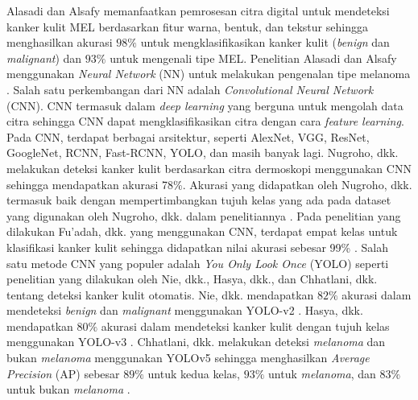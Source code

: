     Alasadi dan Alsafy memanfaatkan pemrosesan citra digital untuk mendeteksi kanker kulit MEL berdasarkan fitur warna, bentuk, dan tekstur sehingga menghasilkan akurasi $98\%$ untuk mengklasifikasikan kanker kulit (\textit{benign} dan \textit{malignant}) dan $93\%$ untuk mengenali tipe MEL. Penelitian Alasadi dan Alsafy menggunakan \textit{Neural Network} (NN) untuk melakukan pengenalan tipe melanoma \citep{Alasadi2015a}. Salah satu perkembangan dari NN adalah \textit{Convolutional Neural Network} (CNN). CNN termasuk dalam \textit{deep learning} yang berguna untuk mengolah data citra sehingga CNN dapat mengklasifikasikan citra dengan cara \textit{feature learning}. Pada CNN, terdapat berbagai arsitektur, seperti AlexNet, VGG, ResNet, GoogleNet, RCNN, Fast-RCNN, YOLO, dan masih banyak lagi. Nugroho, dkk. melakukan deteksi kanker kulit berdasarkan citra dermoskopi menggunakan CNN sehingga mendapatkan akurasi 78\%. Akurasi yang didapatkan oleh Nugroho, dkk. termasuk baik dengan mempertimbangkan tujuh kelas yang ada pada dataset yang digunakan oleh Nugroho, dkk. dalam penelitiannya \citep{Nugroho2019}. Pada penelitian yang dilakukan Fu’adah, dkk. yang menggunakan CNN, terdapat empat kelas untuk klasifikasi kanker kulit sehingga didapatkan nilai akurasi sebesar 99\% \citep{Fuadah2020a}. Salah satu metode CNN yang populer adalah \textit{You Only Look Once} (YOLO) seperti penelitian yang dilakukan oleh Nie, dkk., Hasya, dkk., dan Chhatlani, dkk. tentang deteksi kanker kulit otomatis. Nie, dkk. mendapatkan $82\%$ akurasi dalam mendeteksi \textit{benign} dan \textit{malignant} menggunakan YOLO-v2 \citep{Nie2019a}. Hasya, dkk. mendapatkan $80\%$ akurasi dalam mendeteksi kanker kulit dengan tujuh kelas menggunakan YOLO-v3 \citep{Hasya2021}. Chhatlani, dkk. melakukan deteksi \textit{melanoma} dan bukan \textit{melanoma} menggunakan YOLOv5 sehingga menghasilkan \textit{Average Precision} (AP) sebesar $89\%$ untuk kedua kelas, $93\%$ untuk \textit{melanoma}, dan $83\%$ untuk bukan \textit{melanoma} \citep{Chhatlani2022a}.

